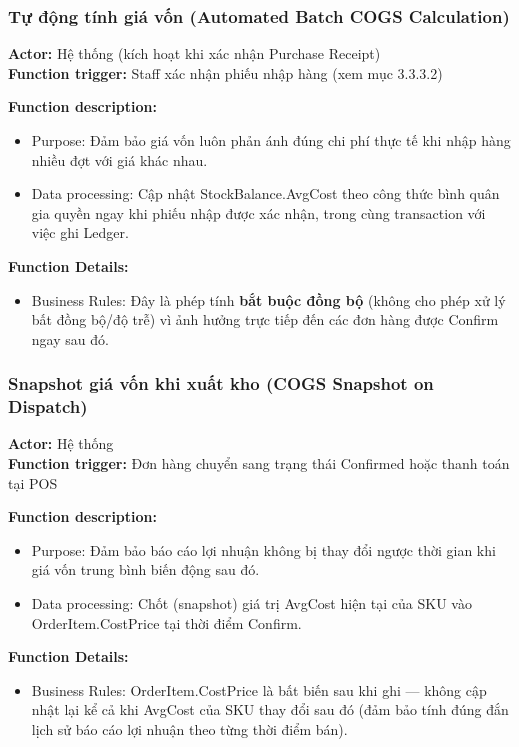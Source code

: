 \subsubsection{Tự động tính giá vốn (Automated Batch COGS Calculation)}
\textbf{Actor:} Hệ thống (kích hoạt khi xác nhận Purchase Receipt) \\
\textbf{Function trigger:} Staff xác nhận phiếu nhập hàng (xem mục 3.3.3.2)

\textbf{Function description:}
\begin{itemize}
    \item Purpose: Đảm bảo giá vốn luôn phản ánh đúng chi phí thực tế khi nhập hàng nhiều đợt với giá khác nhau.
    \item Data processing: Cập nhật StockBalance.AvgCost theo công thức bình quân gia quyền ngay khi phiếu nhập được xác nhận, trong cùng transaction với việc ghi Ledger.
\end{itemize}

\textbf{Function Details:}
\begin{itemize}
    \item Business Rules: Đây là phép tính \textbf{bắt buộc đồng bộ} (không cho phép xử lý bất đồng bộ/độ trễ) vì ảnh hưởng trực tiếp đến các đơn hàng được Confirm ngay sau đó.
\end{itemize}

\subsubsection{Snapshot giá vốn khi xuất kho (COGS Snapshot on Dispatch)}
\textbf{Actor:} Hệ thống \\
\textbf{Function trigger:} Đơn hàng chuyển sang trạng thái Confirmed hoặc thanh toán tại POS

\textbf{Function description:}
\begin{itemize}
    \item Purpose: Đảm bảo báo cáo lợi nhuận không bị thay đổi ngược thời gian khi giá vốn trung bình biến động sau đó.
    \item Data processing: Chốt (snapshot) giá trị AvgCost hiện tại của SKU vào OrderItem.CostPrice tại thời điểm Confirm.
\end{itemize}

\textbf{Function Details:}
\begin{itemize}
    \item Business Rules: OrderItem.CostPrice là bất biến sau khi ghi — không cập nhật lại kể cả khi AvgCost của SKU thay đổi sau đó (đảm bảo tính đúng đắn lịch sử báo cáo lợi nhuận theo từng thời điểm bán).
\end{itemize}

